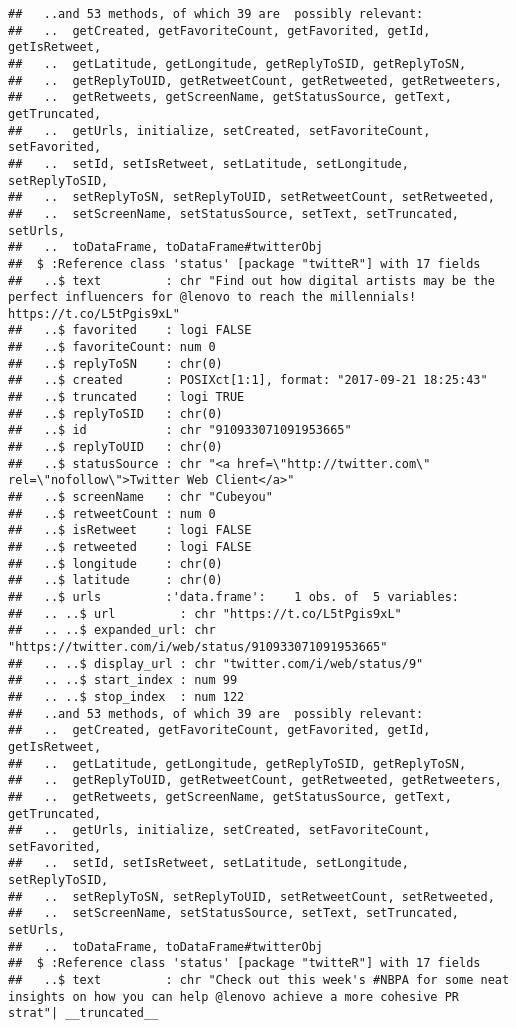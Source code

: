\documentclass[]{article}
\begin{document}
\begin{verbatim}
##   ..and 53 methods, of which 39 are  possibly relevant:
##   ..  getCreated, getFavoriteCount, getFavorited, getId, getIsRetweet,
##   ..  getLatitude, getLongitude, getReplyToSID, getReplyToSN,
##   ..  getReplyToUID, getRetweetCount, getRetweeted, getRetweeters,
##   ..  getRetweets, getScreenName, getStatusSource, getText, getTruncated,
##   ..  getUrls, initialize, setCreated, setFavoriteCount, setFavorited,
##   ..  setId, setIsRetweet, setLatitude, setLongitude, setReplyToSID,
##   ..  setReplyToSN, setReplyToUID, setRetweetCount, setRetweeted,
##   ..  setScreenName, setStatusSource, setText, setTruncated, setUrls,
##   ..  toDataFrame, toDataFrame#twitterObj
##  $ :Reference class 'status' [package "twitteR"] with 17 fields
##   ..$ text         : chr "Find out how digital artists may be the perfect influencers for @lenovo to reach the millennials! https://t.co/L5tPgis9xL"
##   ..$ favorited    : logi FALSE
##   ..$ favoriteCount: num 0
##   ..$ replyToSN    : chr(0) 
##   ..$ created      : POSIXct[1:1], format: "2017-09-21 18:25:43"
##   ..$ truncated    : logi TRUE
##   ..$ replyToSID   : chr(0) 
##   ..$ id           : chr "910933071091953665"
##   ..$ replyToUID   : chr(0) 
##   ..$ statusSource : chr "<a href=\"http://twitter.com\" rel=\"nofollow\">Twitter Web Client</a>"
##   ..$ screenName   : chr "Cubeyou"
##   ..$ retweetCount : num 0
##   ..$ isRetweet    : logi FALSE
##   ..$ retweeted    : logi FALSE
##   ..$ longitude    : chr(0) 
##   ..$ latitude     : chr(0) 
##   ..$ urls         :'data.frame':    1 obs. of  5 variables:
##   .. ..$ url         : chr "https://t.co/L5tPgis9xL"
##   .. ..$ expanded_url: chr "https://twitter.com/i/web/status/910933071091953665"
##   .. ..$ display_url : chr "twitter.com/i/web/status/9"
##   .. ..$ start_index : num 99
##   .. ..$ stop_index  : num 122
##   ..and 53 methods, of which 39 are  possibly relevant:
##   ..  getCreated, getFavoriteCount, getFavorited, getId, getIsRetweet,
##   ..  getLatitude, getLongitude, getReplyToSID, getReplyToSN,
##   ..  getReplyToUID, getRetweetCount, getRetweeted, getRetweeters,
##   ..  getRetweets, getScreenName, getStatusSource, getText, getTruncated,
##   ..  getUrls, initialize, setCreated, setFavoriteCount, setFavorited,
##   ..  setId, setIsRetweet, setLatitude, setLongitude, setReplyToSID,
##   ..  setReplyToSN, setReplyToUID, setRetweetCount, setRetweeted,
##   ..  setScreenName, setStatusSource, setText, setTruncated, setUrls,
##   ..  toDataFrame, toDataFrame#twitterObj
##  $ :Reference class 'status' [package "twitteR"] with 17 fields
##   ..$ text         : chr "Check out this week's #NBPA for some neat insights on how you can help @lenovo achieve a more cohesive PR strat"| __truncated__

\end{verbatim}
\end{document}
